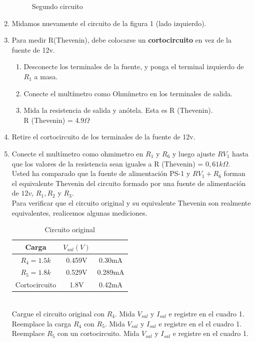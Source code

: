\begin{enumerate}
\begin{figure}[h]
		\caption{Segundo circuito}
	\end{figure}
	\item Midamos nuevamente el circuito de la figura 1 (lado izquierdo).
	\item Para medir R(Thevenin), debe colocarse un \textbf{cortocircuito} en vez de la fuente de 12v.
	\begin{enumerate}
		\item Desconecte los terminales de la fuente, y ponga el terminal izquierdo de $R_{1}$ a masa.
		\item Conecte el multímetro como Ohmímetro en los terminales de salida.
		\item Mida la resistencia de salida y anótela. Esta es R (Thevenin).
		\\ R (Thevenin) = 4.9$\Omega$
	\end{enumerate}
	\item Retire el cortocircuito de los terminales de la fuente de 12v.
	\item Conecte el multímetro como ohmimetro en $R_{1}$ y $R_{6}$ y luego ajuste $RV_{1}$ hasta que los valores de la resistencia sean iguales a R (Thevenin) = $0,61k\Omega$.\\
Usted ha comparado que la fuente de alimentación PS-1 y $RV_{1} + R_{6}$ forman el equivalente Thevenin del circuito formado por una fuente de alimentación de $12v$, $R_{1}, R_{2}$ y $R_{3}$.
\\
Para verificar que el circuito original y su equivalente Thevenin son realmente equivalentes, realicemos algunas mediciones.
\begin{table}[h]
	\centering
	\begin{tabular}{|c|c|c|}
		\hline
		\textbf{Carga}&\textbf{$V_{sal} (V)$}&\text{$I_{sal} (mA)$}\\
		\hline
		$R_{4} =1.5k$&0.459V&0.30mA\\
		\hline
		$R_{5}=1.8k$&0.529V&0.289mA\\
		\hline
		Cortocircuito&1.8V&0.42mA\\
		\hline
	\end{tabular}
	\caption{Circuito original}
\end{table}
\\
Cargue el circuito original con $R_{4}$. Mida $V_{sal}$ y $I_{sal}$ e registre en el cuadro 1.
\\
Reemplace la carga $R_{4}$ con $R_{5}$. Mida $V_{sal}$ y  $I_{sal}$ e registre en el el cuadro 1.
\\
Reemplace $R_{5}$ con un cortocircuito. Mida $V_{sal}$ y $I_{sal}$ e registre en el cuadro 1.

\end{enumerate}
